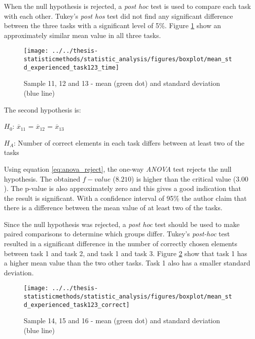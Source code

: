 When the null hypothesis is rejected, a \textit{post hoc} test is used to compare each task with each other. Tukey's \textit{post hos} test did not find any significant difference between the three tasks with a significant level of 5\%. Figure \ref{fig:meanstdexperiencedtask123time} show an approximately similar mean value in all three tasks. %

\begin{figure}[H]
	\centering
	\texttt{[image: ../../thesis-statisticmethods/statistic\_analysis/figures/boxplot/mean\_std\_experienced\_task123\_time]}
	\caption{Sample 11, 12 and 13 - mean (green dot) and standard deviation (blue line)}
	\label{fig:meanstdexperiencedtask123time}
\end{figure}


The second hypothesis is:\\
\centerline{$H_{0}$: $\overline{x}_11$ = $\overline{x}_12$ = $\overline{x}_13$}
\centerline{$H_{A}$: Number of correct elements in each task differs between at least two of the tasks}
\vspace{0.2cm}

Using equation \ref{eq:anova_reject}, the one-way \textit{ANOVA} test rejects the null hypothesis. The obtained $f-value$ ($8.210$) is higher than the critical value ($3.00$). The p-value is also approximately zero and this gives a good indication that the result is significant. With a confidence interval of 95\% the author claim that there is a difference between the mean value of at least two of the tasks. 

Since the null hypothesis was rejected, a \textit{post hoc} test should be used to make paired comparisons to determine which groups differ. Tukey's \textit{post-hoc} test resulted in a significant difference in the number of correctly chosen elements between task 1 and task 2, and task 1 and task 3. Figure \ref{fig:meanstdexperiencedtask123correct} show that task 1 has a higher mean value than the two other tasks. Task 1 also has a smaller standard deviation. 

\begin{figure}[H]
	\centering
	\texttt{[image: ../../thesis-statisticmethods/statistic\_analysis/figures/boxplot/mean\_std\_experienced\_task123\_correct]}
	\caption{Sample 14, 15 and 16 - mean (green dot) and standard deviation (blue line)}
	\label{fig:meanstdexperiencedtask123correct}
\end{figure}

